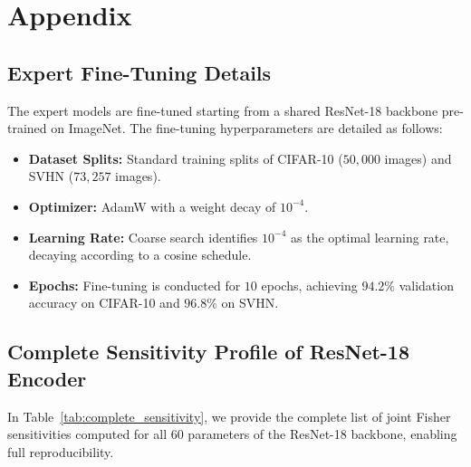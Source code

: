 \documentclass{article}
\theoremstyle{plain}
\theoremstyle{definition}
\theoremstyle{remark}
\begin{document}



\clearpage
\appendix
\section{Appendix}

\subsection{Expert Fine-Tuning Details}
The expert models are fine-tuned starting from a shared ResNet-18 backbone pre-trained on ImageNet. The fine-tuning hyperparameters are detailed as follows:
\begin{itemize}
    \item \textbf{Dataset Splits:} Standard training splits of CIFAR-10 ($50,000$ images) and SVHN ($73,257$ images).
    \item \textbf{Optimizer:} AdamW with a weight decay of $10^{-4}$.
    \item \textbf{Learning Rate:} Coarse search identifies $10^{-4}$ as the optimal learning rate, decaying according to a cosine schedule.
    \item \textbf{Epochs:} Fine-tuning is conducted for $10$ epochs, achieving $94.2\%$ validation accuracy on CIFAR-10 and $96.8\%$ on SVHN.
\end{itemize}

\subsection{Complete Sensitivity Profile of ResNet-18 Encoder}
In Table~\ref{tab:complete_sensitivity}, we provide the complete list of joint Fisher sensitivities computed for all 60 parameters of the ResNet-18 backbone, enabling full reproducibility.
\end{document}

